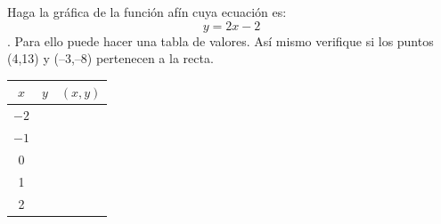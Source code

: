 \documentclass[fleqn]{article}
\begin{document}
\begin{enumerate}
\begin{minipage}{.3\textwidth}
\item Haga la gráfica de la función afín cuya ecuación es: \[y=2x-2\]. Para ello puede hacer una tabla de valores. Así mismo verifique si los puntos (4,13) y (--3,--8) pertenecen a la recta.
\end{minipage}
\begin{minipage}{.4\textwidth}
\end{minipage}
\begin{minipage}{.3\textwidth}
\begin{tabular}{|c|c|c|}
\hline 
$x$ & $y$ & $(x,y)$ \\ 
\hline 
$-2$ &  &  \\ 
\hline 
$-1$ &  &  \\ 
\hline 
0 &  &  \\ 
\hline 
1 &  &  \\ 
\hline 
2 &  &  \\ 
\hline 
\end{tabular} 
\end{minipage}\noanswer


\end{enumerate}
\end{document}
